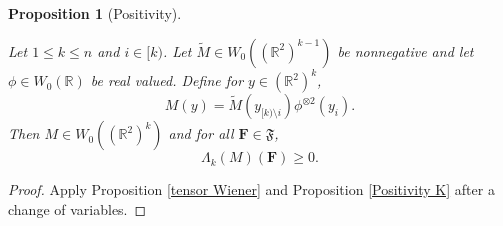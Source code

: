 \documentclass[12pt,reqno]{amsart}
\theoremstyle{plain}
\newtheorem{proposition}[theorem]{Proposition}
\numberwithin{equation}{section}
\theoremstyle{remark}
\newcommand{\uses}[1]{}
\newcommand{\usesdefs}[1]{}
\newcommand{\leanok}{}
\newcommand{\lean}[1]{}
\newcommand{\R}{{\mathbb R}}
\newcommand{\F}{\mathbf{F}}
\begin{document}
\begin{proposition}[Positivity]\label{Positivity M}\uses{tensor Wiener,Positivity K}\usesdefs{auto:Wiener-space-definition,normalized function tuples,prism Brascamp--Lieb,auto:prism-form-definition}
\lean{Auto.positivityM_memW0,Auto.positivityM_nonnegative}
\leanok
Let $1\le k\le n$ and $i\in [k)$. Let $\tilde{M}\in W_0((\R^2)^{k-1})$ be nonnegative
and let $\phi\in W_0(\R)$ be real valued. Define for $y\in (\R^2)^k$,
\begin{equation}\label{auto:positive-prism-product-kernel}
    M(y)=\tilde{M}(y_{[k)\setminus i}) \phi^{\otimes 2}(y_{i}).
\end{equation}
Then $M\in W_0((\R^2)^k)$ and for all $\F\in {\mathfrak{F}}$,
\begin{equation}\label{auto:positive-prism-form}
    \Lambda_k(M)(\F)\ge 0.
\end{equation}
\end{proposition}

\begin{proof}
    Apply Proposition \ref{tensor Wiener} and Proposition \ref{Positivity K} after a change of variables.
\end{proof}
\end{document}
